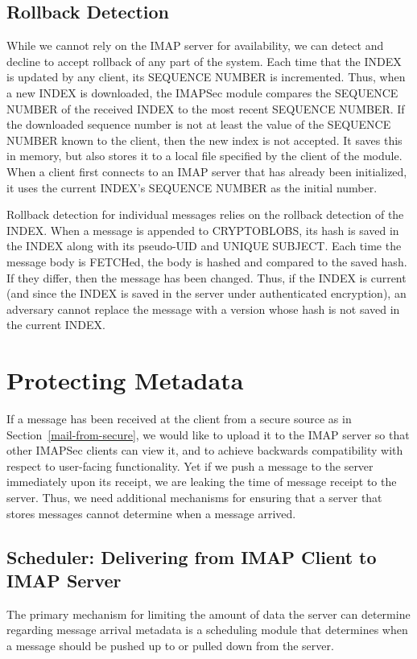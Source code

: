 \documentclass[pageno]{jpaper}
\newcommand{\project}{IMAPSec }
\begin{document}
\label{rollback}
\subsection{Rollback Detection}
While we cannot rely on the IMAP server for availability, we can detect and decline to accept rollback of any part of the system. Each time that the INDEX is updated by any client, its SEQUENCE NUMBER is incremented. Thus, when a new INDEX is downloaded, the \project module compares the SEQUENCE NUMBER of the received INDEX to the most recent SEQUENCE NUMBER. If the downloaded sequence number is not at least the value of the SEQUENCE NUMBER known to the client, then the new index is not accepted. It saves this in memory, but also stores it to a local file specified by the client of the module. When a client first connects to an IMAP server that has already been initialized, it uses the current INDEX's SEQUENCE NUMBER as the initial number.

Rollback detection for individual messages relies on the rollback detection of the INDEX. When a message is appended to CRYPTOBLOBS, its hash is saved in the INDEX along with its pseudo-UID and UNIQUE SUBJECT. Each time the message body is FETCHed, the body is hashed and compared to the saved hash. If they differ, then the message has been changed. Thus, if the INDEX is current (and since the INDEX is saved in the server under authenticated encryption), an adversary cannot replace the message with a version whose hash is not saved in the current INDEX.


\section{Protecting Metadata}

If a message has been received at the client from a secure source as in Section~\ref{mail-from-secure}, we would like to upload it to the IMAP server so that other \project clients can view it, and to achieve backwards compatibility with respect to user-facing functionality. Yet if we push a message to the server immediately upon its receipt, we are leaking the time of message receipt to the server. Thus, we need additional mechanisms for ensuring that a server that stores messages cannot determine when a message arrived.

\subsection{Scheduler: Delivering from IMAP Client to IMAP Server}
The primary mechanism for limiting the amount of data the server can determine regarding message arrival metadata is a scheduling module that determines when a message should be pushed up to or pulled down from the server.
\end{document}
